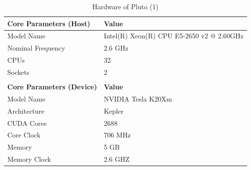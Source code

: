 \documentclass[draft, final]{vutinfth} %
\begin{document}
		\begin{table}[!ht]
		\centering
		\caption{Hardware of Pluto (1)}
		\begin{tabular}{ll}
		\hline
		\multicolumn{1}{|l|}{\textbf{Core Parameters (Host)}}   & \multicolumn{1}{l|}{\textbf{Value}}                                     \\ \hline
		\multicolumn{1}{|l|}{Model Name}               & \multicolumn{1}{l|}{Intel(R) Xeon(R) CPU E5-2650 v2 @ 2.60GHz} \\ \hline
		\multicolumn{1}{|l|}{Nominal Frequency}        & \multicolumn{1}{l|}{2.6 GHz}                                   \\ \hline
		\multicolumn{1}{|l|}{CPUs}                     & \multicolumn{1}{l|}{32}                                        \\ \hline
		\multicolumn{1}{|l|}{Sockets}                  & \multicolumn{1}{l|}{2}                                         \\ \hline
		                                               &                                                                \\ \hline
		\multicolumn{1}{|l|}{\textbf{Core Parameters (Device)}} & \multicolumn{1}{l|}{\textbf{Value}}                                     \\ \hline
		\multicolumn{1}{|l|}{Model Name}               & \multicolumn{1}{l|}{NVIDIA Tesla K20Xm}                        \\ \hline
		\multicolumn{1}{|l|}{Architecture}             & \multicolumn{1}{l|}{Kepler}                                      \\ \hline
		\multicolumn{1}{|l|}{CUDA Cores}               & \multicolumn{1}{l|}{2688}                                      \\ \hline
		\multicolumn{1}{|l|}{Core Clock}               & \multicolumn{1}{l|}{706 MHz}                                   \\ \hline
		\multicolumn{1}{|l|}{Memory}                   & \multicolumn{1}{l|}{5 GB}                                      \\ \hline
		\multicolumn{1}{|l|}{Memory Clock}             & \multicolumn{1}{l|}{2.6 GHZ}                                   \\ \hline
		\end{tabular}
		\end{table}
\end{document}
